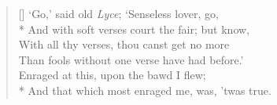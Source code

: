 \documentclass[MAIN]{subfiles}
\begin{document}
\settowidth{\versewidth}{That thou would wish thine own heart dry of blood}
\begin{verse}[\versewidth]
`Go,' said old \emph{Lyce}; `Senseless lover, go,\\*
And with soft verses court the fair; but know,\\
With all thy verses, thou canst get no more\\
Than fools without one verse have had before.'\\
Enraged at this, upon the bawd I flew;\\*
And that which most enraged me, was, 'twas true.
\end{verse}
\end{document}
